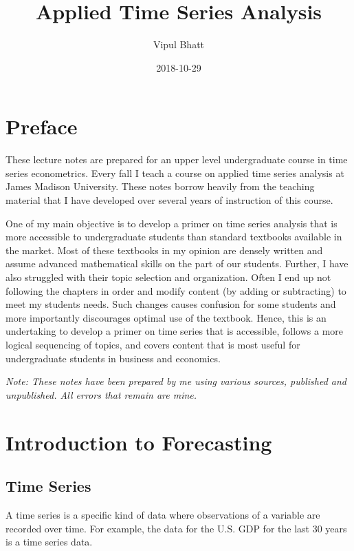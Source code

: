 \documentclass[]{book}
\title{Applied Time Series Analysis}
\author{Vipul Bhatt}
\date{2018-10-29}
\theoremstyle{definition}
\theoremstyle{definition}
\theoremstyle{definition}
\theoremstyle{remark}
\begin{document}
\maketitle

{
\setcounter{tocdepth}{1}
\tableofcontents
}
\hypertarget{preface}{%
\chapter*{Preface}\label{preface}}

These lecture notes are prepared for an upper level undergraduate course
in time series econometrics. Every fall I teach a course on applied time
series analysis at James Madison University. These notes borrow heavily
from the teaching material that I have developed over several years of
instruction of this course.

One of my main objective is to develop a primer on time series analysis
that is more accessible to undergraduate students than standard
textbooks available in the market. Most of these textbooks in my opinion
are densely written and assume advanced mathematical skills on the part
of our students. Further, I have also struggled with their topic
selection and organization. Often I end up not following the chapters in
order and modify content (by adding or subtracting) to meet my students
needs. Such changes causes confusion for some students and more
importantly discourages optimal use of the textbook. Hence, this is an
undertaking to develop a primer on time series that is accessible,
follows a more logical sequencing of topics, and covers content that is
most useful for undergraduate students in business and economics.

\emph{Note: These notes have been prepared by me using various sources,
published and unpublished. All errors that remain are mine.}

\hypertarget{intro}{%
\chapter{Introduction to Forecasting}\label{intro}}

\hypertarget{time-series}{%
\section{Time Series}\label{time-series}}

A time series is a specific kind of data where observations of a
variable are recorded over time. For example, the data for the U.S. GDP
for the last 30 years is a time series data.
\end{document}
